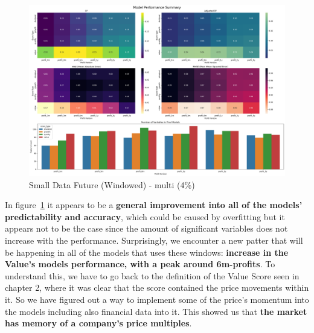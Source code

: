 \documentclass[11pt,english,a4paper,hidelinks]{book}
\begin{document}
\begin{figure}[H]
    \centering
    \includegraphics[width=1\textwidth]{images/code/models/linear_regression/third_model/Small Data future - Multi performance.png}
    \caption{Small Data Future (Windowed) - \acrshort{multi} (4\%)}
    \label{fig:third_linear_regression_summary}
\end{figure}

\noindent In figure~\ref{fig:third_linear_regression_summary} it appears to be a \textbf{general improvement into all of the models' predictability and accuracy}, which could be caused by overfitting but it appears not to be the case since the amount of significant variables does not increase with the performance. Surprisingly, we encounter a new patter that will be happening in all of the models that uses these windows: \textbf{increase in the Value's models performance, with a peak around 6m-profits}. To understand this, we have to go back to the definition of the Value Score seen in chapter 2, where it was clear that the score contained the price movements within it. So we have figured out a way to implement some of the price's momentum into the models including also financial data into it. This showed us that \textbf{the market has memory of a company's price multiples}.
\end{document}
